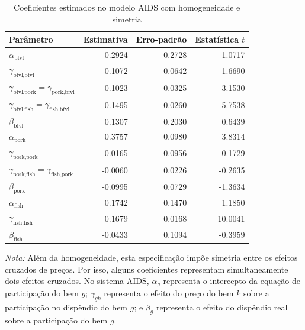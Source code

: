 \begin{table}[H]
\centering
\small
\caption{Coeficientes estimados no modelo AIDS com homogeneidade e simetria}
\label{tab:coeficientes-homog-simetria}
\begin{tabular}{@{}lrrr@{}}
\toprule
Parâmetro & Estimativa & Erro-padrão & Estatística $t$ \\
\midrule
$\alpha_{\text{bfvl}}$ & 0.2924 & 0.2728 & 1.0717 \\
$\gamma_{\text{bfvl},\text{bfvl}}$ & -0.1072 & 0.0642 & -1.6690 \\
$\gamma_{\text{bfvl},\text{pork}}=\gamma_{\text{pork},\text{bfvl}}$ & -0.1023 & 0.0325 & -3.1530 \\
$\gamma_{\text{bfvl},\text{fish}}=\gamma_{\text{fish},\text{bfvl}}$ & -0.1495 & 0.0260 & -5.7538 \\
$\beta_{\text{bfvl}}$ & 0.1307 & 0.2030 & 0.6439 \\
$\alpha_{\text{pork}}$ & 0.3757 & 0.0980 & 3.8314 \\
$\gamma_{\text{pork},\text{pork}}$ & -0.0165 & 0.0956 & -0.1729 \\
$\gamma_{\text{pork},\text{fish}}=\gamma_{\text{fish},\text{pork}}$ & -0.0060 & 0.0226 & -0.2635 \\
$\beta_{\text{pork}}$ & -0.0995 & 0.0729 & -1.3634 \\
$\alpha_{\text{fish}}$ & 0.1742 & 0.1470 & 1.1850 \\
$\gamma_{\text{fish},\text{fish}}$ & 0.1679 & 0.0168 & 10.0041 \\
$\beta_{\text{fish}}$ & -0.0433 & 0.1094 & -0.3959 \\
\bottomrule
\end{tabular}
\par\vspace{0.35em}
\begin{minipage}{0.92\textwidth}
\footnotesize\textit{Nota:} Além da homogeneidade, esta especificação impõe simetria entre os efeitos cruzados de preços. Por isso, alguns coeficientes representam simultaneamente dois efeitos cruzados. No sistema AIDS, $\alpha_g$ representa o intercepto da equação de participação do bem $g$; $\gamma_{gk}$ representa o efeito do preço do bem $k$ sobre a participação no dispêndio do bem $g$; e $\beta_g$ representa o efeito do dispêndio real sobre a participação do bem $g$.
\end{minipage}
\end{table}

